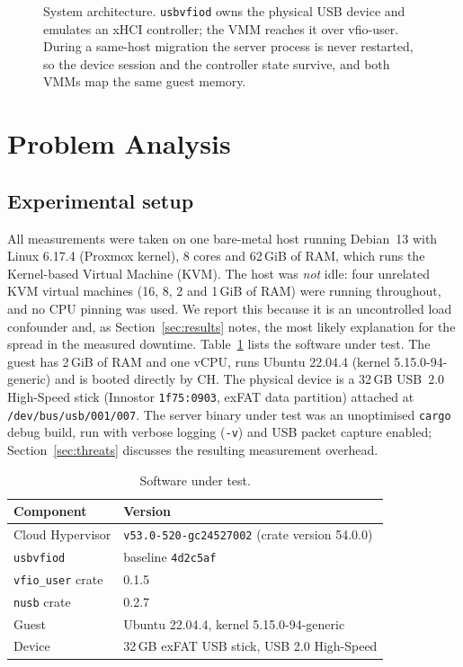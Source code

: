 \documentclass[10pt,conference]{IEEEtran}
\newcommand{\code}[1]{\texttt{#1}}
\begin{document}
\begin{figure}[t]
\centering

\caption{System architecture. \code{usbvfiod} owns the physical USB device and
emulates an xHCI controller; the VMM reaches it over vfio-user. During a
same-host migration the server process is never restarted, so the device
session and the controller state survive, and both VMMs map the same guest
memory.}
\label{fig:arch}
\end{figure}

\section{Problem Analysis}
\label{sec:problem}

\subsection{Experimental setup}
\label{sec:setup}
All measurements were taken on one bare-metal host running Debian~13 with
Linux 6.17.4 (Proxmox kernel), 8 cores and 62\,GiB of RAM, which runs the Kernel-based Virtual Machine (KVM). The
host was \emph{not} idle: four unrelated KVM virtual machines (16, 8, 2 and
1\,GiB of RAM) were running throughout, and no CPU pinning was used. We report
this because it is an uncontrolled load confounder and, as
Section~\ref{sec:results} notes, the most likely explanation for the spread in
the measured downtime. Table~\ref{tab:setup} lists the software under test. The
guest has 2\,GiB of RAM and one vCPU, runs Ubuntu 22.04.4 (kernel
5.15.0-94-generic) and is booted directly by CH. The physical device is a 32\,GB
USB~2.0 High-Speed stick (Innostor \code{1f75:0903}, exFAT data partition)
attached at \code{/dev/bus/usb/001/007}. The server binary under test was an
unoptimised \code{cargo} debug build, run with verbose logging
(\code{-v}) and USB packet capture enabled; Section~\ref{sec:threats}
discusses the resulting measurement overhead.

\begin{table}[t]
\centering
\caption{Software under test.}
\label{tab:setup}
\footnotesize
\setlength{\tabcolsep}{4pt}
\begin{tabular}{@{}ll@{}}
\toprule
Component & Version \\
\midrule
Cloud Hypervisor & \code{v53.0-520-gc24527002} (crate version 54.0.0) \cite{chrepo} \\
\code{usbvfiod} & baseline \code{4d2c5af} \cite{usbvfiodrepo} \\
\code{vfio\_user} crate & 0.1.5 \cite{vfiousercrate} \\
\code{nusb} crate & 0.2.7 \cite{nusb} \\
Guest & Ubuntu 22.04.4, kernel 5.15.0-94-generic \\
Device & 32\,GB exFAT USB stick, USB 2.0 High-Speed \\
\bottomrule
\end{tabular}
\end{table}
\end{document}
